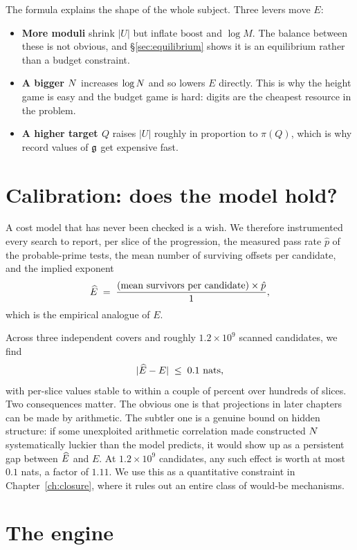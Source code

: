 The formula explains the shape of the whole subject. Three levers move $E$:
\begin{itemize}
\item \textbf{More moduli} shrink $|U|$ but inflate $\mathrm{boost}$ and
$\log M$. The balance between these is not obvious, and \S\ref{sec:equilibrium}
shows it is an equilibrium rather than a budget constraint.
\item \textbf{A bigger $N$} increases $\log N$ and so lowers $E$ directly. This
is why the height game is easy and the budget game is hard: digits are the
cheapest resource in the problem.
\item \textbf{A higher target $Q$} raises $|U|$ roughly in proportion to
$\pi(Q)$, which is why record values of $\mathfrak{g}$ get expensive fast.
\end{itemize}

\section{Calibration: does the model hold?}\label{sec:calibration}

A cost model that has never been checked is a wish. We therefore instrumented
every search to report, per slice of the progression, the measured pass rate
$\hat p$ of the probable-prime tests, the mean number of surviving offsets per
candidate, and the implied exponent
\[
\widehat{E}\;=\;\frac{(\text{mean survivors per candidate})\times\hat p}{1},
\]
which is the empirical analogue of $E$.

Across three independent covers and roughly $1.2\times10^{9}$ scanned
candidates, we find
\[
|\widehat{E}-E|\;\le\;0.1\ \text{nats},
\]
with per-slice values stable to within a couple of percent over hundreds of
slices. Two consequences matter. The obvious one is that projections in later
chapters can be made by arithmetic. The subtler one is a genuine bound on
hidden structure: if some unexploited arithmetic correlation made constructed
$N$ systematically luckier than the model predicts, it would show up as a
persistent gap between $\widehat{E}$ and $E$. At $1.2\times10^{9}$ candidates, any
such effect is worth at most $0.1$ nats, a factor of $1.11$. We use this as a
quantitative constraint in Chapter~\ref{ch:closure}, where it rules out an
entire class of would-be mechanisms.

\section{The engine}\label{sec:engine}

